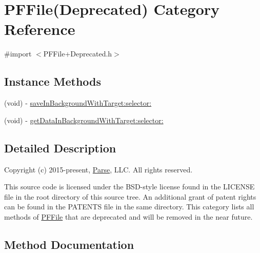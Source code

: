 \hypertarget{category_p_f_file_07_deprecated_08}{}\section{P\+F\+File(Deprecated) Category Reference}
\label{category_p_f_file_07_deprecated_08}


{\ttfamily \#import $<$P\+F\+File+\+Deprecated.\+h$>$}

\subsection*{Instance Methods}
\begin{DoxyCompactItemize}
\item 
(void) -\/ \hyperlink{category_p_f_file_07_deprecated_08_a47dde8e577621ac0baac216731d1c8a5}{save\+In\+Background\+With\+Target\+:selector\+:}
\begin{DoxyCompactList}\small\item\em 

 \end{DoxyCompactList}\item 
(void) -\/ \hyperlink{category_p_f_file_07_deprecated_08_aca77cfbc8b945eb0c7f67301bb983d83}{get\+Data\+In\+Background\+With\+Target\+:selector\+:}
\begin{DoxyCompactList}\small\item\em 

 \end{DoxyCompactList}\end{DoxyCompactItemize}


\subsection{Detailed Description}
Copyright (c) 2015-\/present, \hyperlink{interface_parse}{Parse}, L\+L\+C. All rights reserved.

This source code is licensed under the B\+S\+D-\/style license found in the L\+I\+C\+E\+N\+S\+E file in the root directory of this source tree. An additional grant of patent rights can be found in the P\+A\+T\+E\+N\+T\+S file in the same directory. This category lists all methods of {\ttfamily \hyperlink{interface_p_f_file}{P\+F\+File}} that are deprecated and will be removed in the near future. 

\subsection{Method Documentation}
\hypertarget{category_p_f_file_07_deprecated_08_aca77cfbc8b945eb0c7f67301bb983d83}{}
